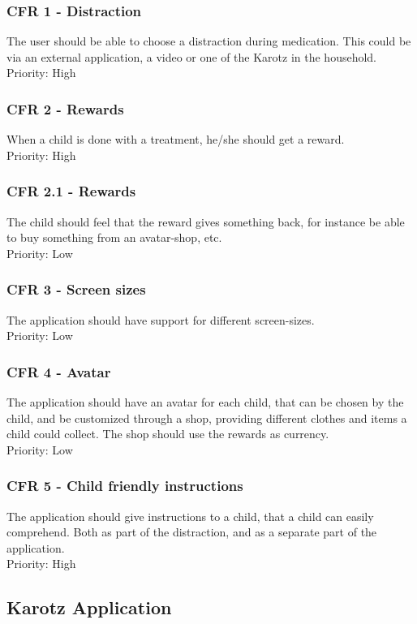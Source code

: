 \subsubsection{CFR 1 - Distraction}
The user should be able to choose a distraction during medication. This could be
via an external application, a video or one of the Karotz in the household.
\\
Priority: High

\subsubsection{CFR 2 - Rewards}
When a child is done with a treatment, he/she should get a reward.
\\
Priority: High

\subsubsection{CFR 2.1 - Rewards}
The child should feel that the reward gives something back, for instance be able to buy something from
an avatar-shop, etc. 
\\
Priority: Low


\subsubsection{CFR 3 - Screen sizes}
The application should have support for different screen-sizes.
\\
Priority: Low

\subsubsection{CFR 4 - Avatar}
The application should have an avatar for each child, that can be chosen by the child, and be
customized through a shop, providing different clothes and items a child could collect. The shop should use the rewards as currency.
\\
Priority: Low

\subsubsection{CFR 5 - Child friendly instructions}
The application should give instructions to a child, that a child can easily comprehend. Both as part of the distraction, 
and as a separate part of the application.  
\\
Priority: High

\subsection{Karotz Application}

